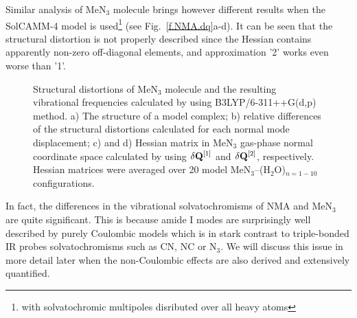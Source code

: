 \documentclass[a4paper,titlepage,twoside,fleqn,12pt]{book}
\begin{document}
\begin{refsection}
Similar analysis of MeN$_3$ molecule brings however different results when the SolCAMM-4 model is
used\footnote{with solvatochromic multipoles disributed over all heavy atoms} 
(see Fig.~\ref{f.NMA.dq}a-d). It can be seen that
the structural distortion is not properly described since the Hessian contains apparently
non-zero off-diagonal elements, and approximation '2' works even worse than '1'. 
%
\begin{figure}[ht]
\centering
\setlength\fboxsep{0.4pt}
\setlength\fboxrule{0.5pt}
\caption{Structural distortions of MeN$_3$ molecule and the resulting vibrational
frequencies calculated by using B3LYP/6-311++G(d,p) method. 
a) The structure of a model complex; b) relative differences of the
structural distortions
calculated for each normal mode displacement; c) and d) Hessian matrix in MeN$_3$ gas-phase normal coordinate
space calculated by using $\delta {\bf Q}^{[1]}$ and $\delta {\bf Q}^{[2]}$, respectively.
Hessian matrices were averaged over 20 model MeN$_3$--(H$_2$O)$_{n=1-10}$ configurations.
\label{f.MeN3.dq}}
\end{figure}
%

In fact, the differences in the vibrational solvatochromisms of NMA and MeN$_3$ are quite significant. 
This is because amide I modes are surprisingly well described by purely Coulombic 
models\citep{Blasiak.Lee.Cho.JCP.2013,Blasiak.Cho.JCP.2014,Blasiak.Cho.JCP.2015}
which is in stark contrast to triple\hyp{}bonded IR probes solvatochromisms such as 
CN, NC or N$_3$.\citep{Blasiak.Ritchie.Webb.Cho.XXX.2016,Blasiak.Maj.Cho.XXX.2016}
We will discuss this issue in more detail later when the non-Coulombic effects 
are also derived and extensively quantified.


\end{refsection}
\end{document}
